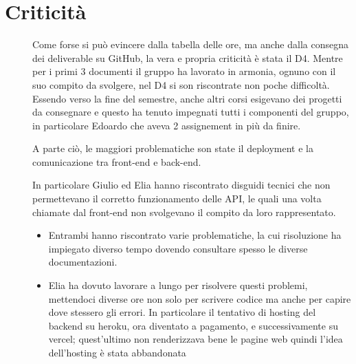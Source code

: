 \documentclass{article}
\begin{document}
\section{Criticità}
\begin{description}
    \item[] Come forse si può evincere dalla tabella delle ore, ma anche dalla consegna dei deliverable su GitHub, la vera e propria criticità è stata il D4. Mentre per i primi 3 documenti il gruppo ha lavorato in armonia, ognuno con il suo compito da svolgere, nel D4 si son riscontrate non poche difficoltà. Essendo verso la fine del semestre, anche altri corsi esigevano dei progetti da consegnare e questo ha tenuto impegnati tutti i componenti del gruppo, in particolare Edoardo che aveva 2 assignement in più da finire.
    \item[] A parte ciò, le maggiori problematiche son state il deployment e la comunicazione tra front-end e back-end.
    \item[] In particolare Giulio ed Elia hanno riscontrato disguidi tecnici che non permettevano il corretto funzionamento delle API, le quali una volta chiamate dal front-end non svolgevano il compito da loro rappresentato.
        \begin{itemize}
            \item Entrambi hanno riscontrato varie problematiche, la cui risoluzione ha impiegato diverso tempo dovendo consultare spesso le diverse documentazioni.
            \item Elia ha dovuto lavorare a lungo per risolvere questi problemi, mettendoci diverse ore non solo per scrivere codice ma anche per capire dove stessero gli errori.
                  In particolare il tentativo di hosting del backend su heroku, ora diventato a pagamento, e successivamente su vercel; quest'ultimo non renderizzava bene le pagine web quindi l'idea dell'hosting è stata abbandonata
        \end{itemize}
\end{description}
\clearpage
\end{document}

